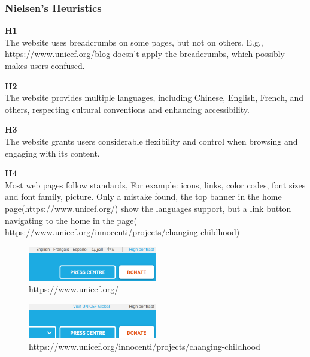 \subsubsection{Nielsen's Heuristics}
\begin{description}
\item {\textbf{H1} \color{unicefGray}{Visibility of the system status}}\\
The website uses breadcrumbs on some pages, but not on others. E.g., https://www.unicef.org/blog doesn't apply the breadcrumbs, which possibly makes users confused.

\item {\textbf{H2} \color{unicefGray}{Match between system and the real world}}\\
The website provides multiple languages, including Chinese, English, French, and others, respecting cultural conventions and enhancing accessibility.

\item {\textbf{H3} \color{unicefGray}{User control and freedom}}\\
The website grants users considerable flexibility and control when browsing and engaging with its content.

\item {\textbf{H4} \color{unicefGray}{Consistency and standards}}\\
Most web pages follow standards, For example: icons, links, color codes, font sizes and font family, picture. 
Only a mistake found, the top banner in the home page(https://www.unicef.org/) show the languages support, but a link button navigating to the home in the page( https://www.unicef.org/innocenti/projects/changing-childhood)
\begin{figure}[h]
	\centering
	\includegraphics[width=0.5\textwidth]{Resources/Yan/yan_h4_1.png}
	\caption{https://www.unicef.org/}
	\label{fig:h4_1}
\end{figure}
\begin{figure}[h]
	\centering
	\includegraphics[width=0.5\textwidth]{Resources/Yan/yan_h4_2.png}
	\caption{https://www.unicef.org/innocenti/projects/changing-childhood}
	\label{fig:h4_2}
\end{figure}


\end{description}
